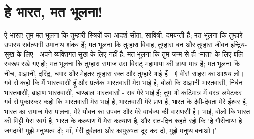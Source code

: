 \section*{हे भारत, मत भूलना!}


ऐ भारत! तुम मत भूलना कि तुम्हारी स्त्रियों का आदर्श सीता, सावित्री, दमयन्ती हैं; मत भूलना कि तुम्हारे उपास्य सर्वत्यागी उमानाथ शंकर हैं; मत भूलना कि तुम्हारा विवाह, तुम्हारा धन और तुम्हारा जीवन इन्द्रिय-सुख के लिए - अपने व्यक्तिगत सुख के लिए नहीं है; मत भूलना कि तुम जन्म से ही ‘माता’ के लिए बलि-स्वरूप रखे गए हो; मत भूलना कि तुम्हारा समाज उस विराट् महामाया की छाया मात्र है; मत भूलना कि नीच, अज्ञानी, दरिद्र, चमार और मेहतर तुम्हारा रक्त और तुम्हारे भाई हैं। ऐ वीर! साहस का आश्रय लो। गर्व से कहो कि मैं भारतवासी हूँ और प्रत्येक भारतवासी मेरा भाई है, बोलो कि अज्ञानी भारतवासी, निर्धन भारतवासी, ब्राह्मण भारतवासी, चाण्डाल भारतवासी - सब मेरे भाई हैं; तुम भी कटिमात्र में वस्त्र लपेटकर गर्व से पुकारकर कहो कि भारतवासी मेरा भाई है, भारतवासी मेरे प्राण हैं, भारत के देवी-देवता मेरे ईश्वर हैं, भारत का समाज मेरा पालना, मेरे यौवन का उपवन और मेरे वार्धक्य की वाराणसी है। भाई, बोलो कि भारत की मिट्टी मेरा स्वर्ग है, भारत के कल्याण में मेरा कल्याण है, और रात-दिन कहते रहो कि ‘हे गौरीनाथ! हे जगदम्बे! मुझे मनुष्यत्व दो; माँ, मेरी दुर्बलता और कापुरुषता दूर कर दो, मुझे मनुष्य बनाओ।’ 

\delimiter

\addtoendnotes{\protect\end{multicols}}


